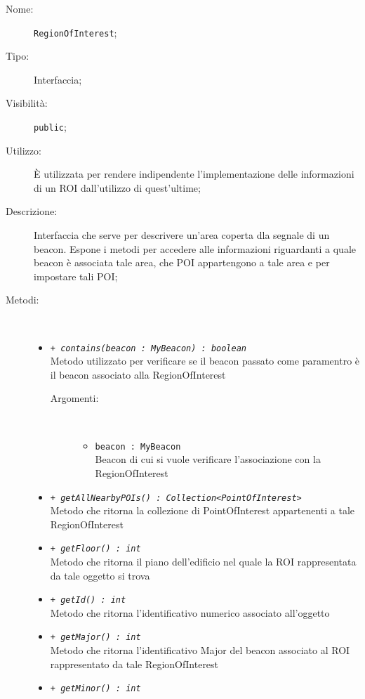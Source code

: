 \documentclass[../DefinizioneDiProdotto.tex]{subfiles}
\begin{document}
    \begin{description}
\item[Nome:] \texttt{RegionOfInterest};
\item[Tipo:] Interfaccia;
\item[Visibilità:] \texttt{public};
\item[Utilizzo:] È utilizzata per rendere indipendente l'implementazione delle informazioni di un ROI dall'utilizzo di quest'ultime;
\item[Descrizione:] Interfaccia che serve per descrivere un'area coperta dla segnale di un beacon. Espone i metodi per accedere alle informazioni riguardanti a quale beacon è associata tale area, che POI appartengono a tale area e per impostare tali POI;
\item[Metodi:] \
\begin{itemize}
\item \texttt{+ \textit{contains(beacon : MyBeacon) : boolean}}\\
Metodo utilizzato per verificare se il beacon passato come paramentro è il beacon associato alla RegionOfInterest
 \begin{description}
\item[Argomenti:] \
\begin{itemize}
\item \texttt{beacon : MyBeacon}\\
Beacon di cui si vuole verificare l'associazione con la RegionOfInterest\end{itemize}
\end{description}
\item \texttt{+ \textit{getAllNearbyPOIs() : Collection<PointOfInterest>}}\\
Metodo che ritorna la collezione di PointOfInterest appartenenti a tale RegionOfInterest
 \item \texttt{+ \textit{getFloor() : int}}\\
Metodo che ritorna il piano dell'edificio nel quale la ROI rappresentata da tale oggetto si trova
 \item \texttt{+ \textit{getId() : int}}\\
Metodo che ritorna l'identificativo numerico associato all'oggetto
 \item \texttt{+ \textit{getMajor() : int}}\\
Metodo che ritorna l'identificativo Major del beacon associato al ROI rappresentato da tale RegionOfInterest
 \item \texttt{+ \textit{getMinor() : int}}\\

\end{itemize}
\end{description}
\end{document}
